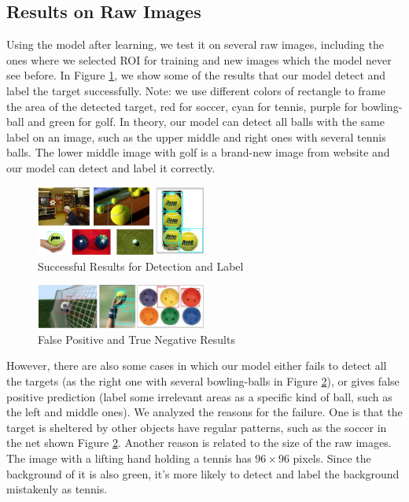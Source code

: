 \documentclass{article}
\begin{document}
\subsection{Results on Raw Images}
Using the model after learning, we test it on several raw images, including the ones where we selected ROI for training and new images which the model never see before. In Figure \ref{fig:succefulResult}, we show some of the results that our model detect and label the target successfully. Note: we use different colors of rectangle to frame the area of the detected target, red for soccer, cyan for tennis, purple for bowling-ball and green for golf. In theory, our model can detect all balls with the same label on an image, such as the upper middle and right ones with several tennis balls. The lower middle image with golf is a brand-new image from website and our model can detect and label it correctly. \\

\begin{figure}[htb]
\centering
\includegraphics[width=0.5\textwidth]{successfulResult.jpg}
\caption{Successful Results for Detection and Label}
\label{fig:succefulResult}
\end{figure}

\begin{figure}[htp]
\centering
\includegraphics[width=0.5\textwidth]{failedResult.jpg}
\caption{False Positive and True Negative Results}
\label{fig:failedResult}
\end{figure}

However, there are also some cases in which our model either fails to detect all the targets (as the right one with several bowling-balls in Figure \ref{fig:failedResult}), or gives false positive prediction (label some irrelevant areas as a specific kind of ball, such as the left and middle ones). We analyzed the reasons for the failure. One is that the target is sheltered by other objects have regular patterns, such as the soccer in the net shown Figure \ref{fig:failedResult}. Another reason is related to the size of the raw images. The image with a lifting hand holding a tennis has $96\times96$ pixels. Since the background of it is also green, it's more likely to detect and label the background mistakenly as tennis.
\end{document}
